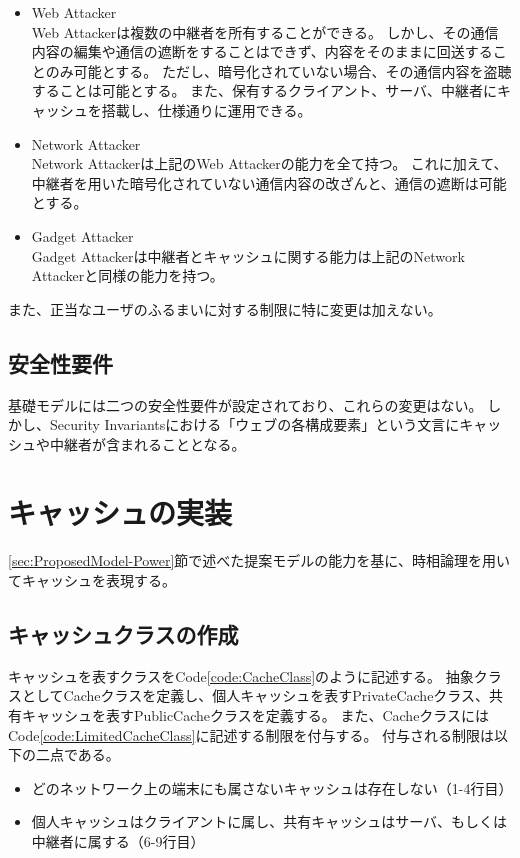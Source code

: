\documentclass[12pt,a4paper]{jbook}
\begin{document}
\begin{itemize}
\item Web Attacker\\
Web Attackerは複数の中継者を所有することができる。
しかし、その通信内容の編集や通信の遮断をすることはできず、内容をそのままに回送することのみ可能とする。
ただし、暗号化されていない場合、その通信内容を盗聴することは可能とする。
また、保有するクライアント、サーバ、中継者にキャッシュを搭載し、仕様通りに運用できる。
\item Network Attacker\\
Network Attackerは上記のWeb Attackerの能力を全て持つ。
これに加えて、中継者を用いた暗号化されていない通信内容の改ざんと、通信の遮断は可能とする。
\item Gadget Attacker\\
Gadget Attackerは中継者とキャッシュに関する能力は上記のNetwork Attackerと同様の能力を持つ。
\end{itemize}

また、正当なユーザのふるまいに対する制限に特に変更は加えない。

\subsection{安全性要件}
基礎モデルには二つの安全性要件が設定されており、これらの変更はない。
しかし、Security Invariantsにおける「ウェブの各構成要素」という文言にキャッシュや中継者が含まれることとなる。

\section{キャッシュの実装}
\ref{sec:ProposedModel-Power}節で述べた提案モデルの能力を基に、時相論理を用いてキャッシュを表現する。

\subsection{キャッシュクラスの作成}
キャッシュを表すクラスをCode\ref{code:CacheClass}のように記述する。
抽象クラスとしてCacheクラスを定義し、個人キャッシュを表すPrivateCacheクラス、共有キャッシュを表すPublicCacheクラスを定義する。
また、CacheクラスにはCode\ref{code:LimitedCacheClass}に記述する制限を付与する。
付与される制限は以下の二点である。
\begin{itemize}
\item どのネットワーク上の端末にも属さないキャッシュは存在しない（1-4行目）
\item 個人キャッシュはクライアントに属し、共有キャッシュはサーバ、もしくは中継者に属する（6-9行目）
\end{itemize}
\end{document}
